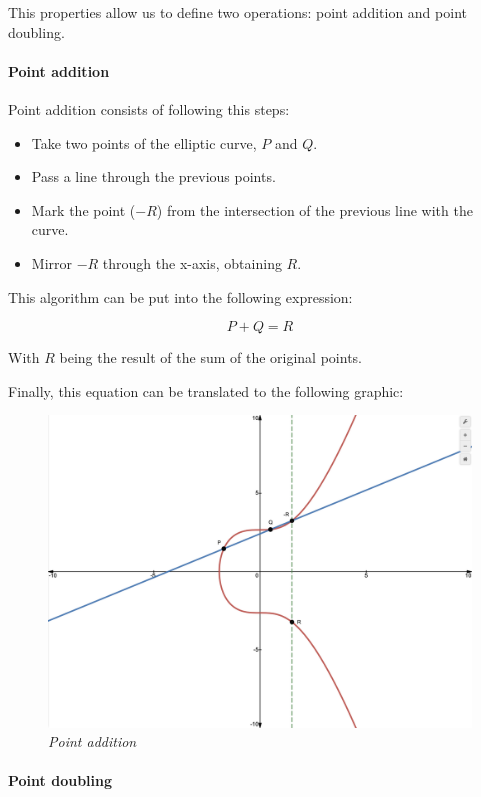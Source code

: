\documentclass{article}
\newcommand\tab[1][1cm]{\hspace*{#1}}
\begin{document}
This properties allow us to define two operations: point addition and point doubling.

\paragraph{Point addition}

\tab Point addition consists of following this steps:

\begin{itemize}
    \item Take two points of the elliptic curve, \(P\) and \(Q\).
    \item Pass a line through the previous points.
    \item Mark the point (\(-R\)) from the intersection of the previous line with the curve.
    \item Mirror \(-R\) through the x-axis, obtaining \(R\).
\end{itemize}

This algorithm can be put into the following expression:

\[P + Q = R\]

With \(R\) being the result of the sum of the original points.

Finally, this equation can be translated to the following graphic:

\begin{figure}[H]
    \begin{center}
        \includegraphics[width=0.5 \textwidth]{images/point_addition.png}
        \caption{\textit{Point addition}}
    \end{center}
\end{figure}

\paragraph{Point doubling}
\end{document}
